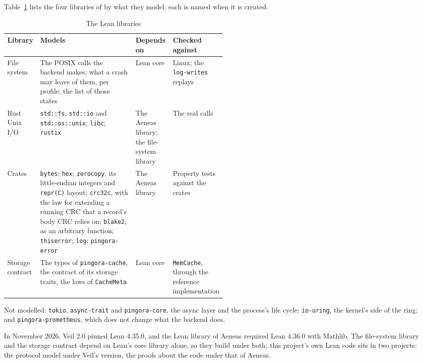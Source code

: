 Table~\ref{tab:verification-libraries} lists the four libraries of
 by what they model; each is named when it
is created.

\begin{table}[tb]
\centering\small\renewcommand{\arraystretch}{1.3}%
\caption{The Lean libraries}\label{tab:verification-libraries}
\begin{tabularx}{\linewidth}{|>{\raggedright\arraybackslash}p{0.15\linewidth}|>{\raggedright\arraybackslash}X|>{\raggedright\arraybackslash}p{0.17\linewidth}|>{\raggedright\arraybackslash}p{0.2\linewidth}|}
\hline
\textbf{Library} & \textbf{Models} & \textbf{Depends on} & \textbf{Checked against} \\
\hline
File system & The POSIX calls the backend makes; what a crash may leave of them, per profile; the list of those states & Lean core & Linux; the \texttt{log-writes} replays \\
\hline
Rust Unix I/O & \texttt{std::fs}, \texttt{std::io} and \texttt{std::os::unix}; \texttt{libc}; \texttt{rustix} & The Aeneas library; the file-system library & The real calls \\
\hline
Crates & \texttt{bytes}; \texttt{hex}; \texttt{zerocopy}, its little-endian integers and \texttt{repr(C)} layout; \texttt{crc32c}, with the law for extending a running CRC that a record's body CRC relies on; \texttt{blake2}, as an arbitrary function; \texttt{thiserror}; \texttt{log}; \texttt{pingora-error} & The Aeneas library & Property tests against the crates \\
\hline
Storage contract & The types of \texttt{pingora-cache}, the contract of its storage traits, the laws of \texttt{CacheMeta} & Lean core & \texttt{MemCache}, through the reference implementation \\
\hline
\end{tabularx}
\end{table}

Not modelled: \texttt{tokio}, \texttt{async-trait} and \texttt{pingora-core},
the async layer and the process's life cycle; \texttt{io-uring}, the kernel's
side of the ring; and \texttt{pingora-prometheus}, which does not change what
the backend does.

In November 2026, Veil 2.0 pinned Lean 4.35.0, and the Lean library of
Aeneas required Lean 4.36.0 with Mathlib. The file-system library and the
storage contract depend on Lean's core library alone, so they build under
both; this project's own Lean code sits in two projects: the protocol model
under Veil's version, the proofs about the code under that of Aeneas.

